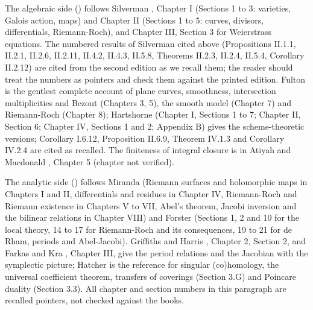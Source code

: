 The algebraic side () follows
Silverman \cite{SilvermanAEC}, Chapter I (Sections 1 to 3: varieties, Galois action, maps) and Chapter II (Sections 1 to 5: curves, divisors, differentials, Riemann-Roch), and Chapter III,
Section 3 for Weierstrass equations. The numbered results of Silverman cited above (Propositions II.1.1, II.2.1, II.2.6, II.2.11, II.4.2, II.4.3, II.5.8, Theorems II.2.3, II.2.4, II.5.4,
Corollary II.2.12) are cited from the second edition as we recall them; the reader should treat the numbers as pointers and check them against the printed edition. Fulton \cite{Fulton}
is the gentlest complete account of plane curves, smoothness, intersection multiplicities and Bezout (Chapters 3, 5), the smooth model (Chapter 7) and Riemann-Roch (Chapter 8); Hartshorne
\cite{Hartshorne} (Chapter I, Sections 1 to 7; Chapter II, Section 6; Chapter IV, Sections 1 and 2; Appendix B) gives the scheme-theoretic versions; Corollary I.6.12, Proposition II.6.9, Theorem
IV.1.3 and Corollary IV.2.4 are cited as recalled. The finiteness of integral closure is in Atiyah and Macdonald \cite{AtiyahMacdonald}, Chapter 5 (chapter not verified).

The analytic side () follows Miranda \cite{Miranda} (Riemann surfaces and
holomorphic maps in Chapters I and II, differentials and residues in Chapter IV, Riemann-Roch and Riemann existence in Chapters V to VII, Abel's theorem, Jacobi inversion and the
bilinear relations in Chapter VIII) and Forster \cite{Forster81} (Sections 1, 2 and 10 for the local theory, 14 to 17 for Riemann-Roch and its consequences, 19 to 21 for de Rham, periods and
Abel-Jacobi). Griffiths and Harris \cite{GriffithsHarris78}, Chapter 2, Section 2, and Farkas and Kra \cite{FarkasKra92}, Chapter III, give the period relations and the Jacobian with the
symplectic picture; Hatcher \cite{Hatcher02} is the reference for singular (co)homology, the universal coefficient theorem, transfers of coverings (Section 3.G) and Poincare duality (Section
3.3). All chapter and section numbers in this paragraph are recalled pointers, not checked against the books.

